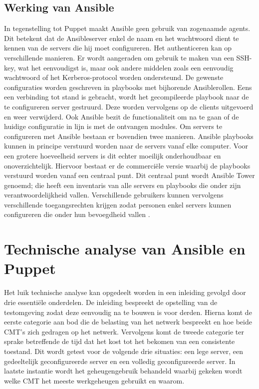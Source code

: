 \subsection{Werking van Ansible}

In tegenstelling tot Puppet maakt Ansible geen gebruik van zogenaamde agents. Dit betekent dat de Ansibleserver enkel de naam en het wachtwoord dient te kennen van de servers die hij moet configureren. Het authenticeren kan op verschillende manieren. Er wordt aangeraden om gebruik te maken van een SSH-key, wat het eenvoudigst is, maar ook andere middelen zoals een eenvoudig wachtwoord of het Kerberos-protocol worden ondersteund. \newline
De gewenste configuraties worden geschreven in playbooks met bijhorende Ansiblerollen. Eens een verbinding tot stand is gebracht, wordt het gecompileerde playbook naar de te configureren server gestruurd. Deze worden vervolgens op de clients uitgevoerd  en weer verwijderd. Ook Ansible bezit de functionaliteit om na te gaan of de huidige configuratie in lijn is met de ontvangen modules. \newline
Om servers te configureren met Ansible bestaan er bovendien twee manieren. Ansible playbooks kunnen in principe verstuurd worden naar de servers vanaf elke computer. Voor een grotere hoeveelheid servers is dit echter moeilijk onderhoudbaar en onoverzichtelijk. Hiervoor bestaat er de commerci\"ele versie waarbij de playbooks verstuurd worden vanaf een centraal punt. Dit centraal punt wordt Ansible Tower genoemd; die heeft een inventaris van alle servers en playbooks die onder zijn verantwoordelijkheid vallen. Verschillende gebruikers kunnen vervolgens verschillende toegangsrechten krijgen zodat personen enkel servers kunnen configureren die onder hun bevoegdheid vallen \autocite{ansibledoc}.




\section{Technische analyse van Ansible en Puppet}
\label{sec:technischeanalyse}

Het luik technische analyse kan opgedeelt worden in een inleiding gevolgd door drie essenti\"ele onderdelen. De inleiding bespreekt de opstelling van de testomgeving zodat deze eenvoudig na te bouwen is voor derden. \newline
Hierna komt de eerste categorie aan bod die de belasting van het netwerk bespreekt  en hoe beide \gls{CMT}'s zich gedragen op het netwerk. \newline
Vervolgens komt de tweede categorie ter sprake betreffende de tijd dat het kost tot het bekomen van een consistente toestand. Dit wordt getest voor de volgende drie situaties: een lege server, een gedeeltelijk geconfigureerde server en een volledig geconfigureerde server.\newline
In laatste instantie wordt het geheugengebruik behandeld waarbij gekeken wordt welke \gls{CMT} het meeste werkgeheugen gebruikt en waarom.

